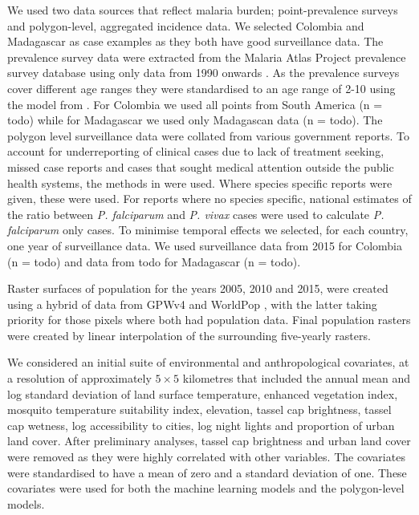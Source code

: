 \documentclass[11pt]{article}
\begin{document}
We used two data sources that reflect malaria burden; point-prevalence surveys and polygon-level, aggregated incidence data. 
We selected Colombia and Madagascar as case examples as they both have good surveillance data.
The prevalence survey data were extracted from the Malaria Atlas Project prevalence survey database using only data from 1990 onwards \citep{bhatt2015effect}.  %
As the prevalence surveys cover different age ranges they were standardised to an age range of 2-10 using the model from \citep{smith2007standardizing}. 
For Colombia we used all points from South America (n = todo) while for Madagascar we used only Madagascan data (n = todo).
The polygon level surveillance data were collated from various government reports. 
To account for underreporting of clinical cases due to lack of treatment seeking, missed case reports and cases that sought medical attention outside the public health systems, the methods in \citep{cibulskis2011worldwide} were used. Where species specific reports were given, these were used. For reports where no species specific, national estimates of the ratio between \emph{P. falciparum} and \emph{P. vivax} cases were used to calculate \emph{P. falciparum} only cases. To minimise temporal effects we selected, for each country, one year of surveillance data. 
We used surveillance data from 2015 for Colombia (n = todo) and data from todo for Madagascar (n = todo).

Raster surfaces of population for the years 2005, 2010 and 2015, were created using a hybrid of data from GPWv4 \citep{gpw4} and WorldPop \citep{tatem2017worldpop}, with the latter taking priority for those pixels where both had population data. 
Final population rasters were created by linear interpolation of the surrounding five-yearly rasters. 

We considered an initial suite of environmental and anthropological covariates, at a resolution of approximately $5 \times 5$ kilometres that included the annual mean and log standard deviation of land surface temperature, enhanced vegetation index, mosquito temperature suitability index, elevation, tassel cap brightness, tassel cap wetness, log accessibility to cities, log night lights and proportion of urban land cover. 
After preliminary analyses, tassel cap brightness and urban land cover were removed as they were highly correlated with other variables. 
The covariates were standardised to have a mean of zero and a standard deviation of one. 
These covariates were used for both the machine learning models and the polygon-level models.
\end{document}

